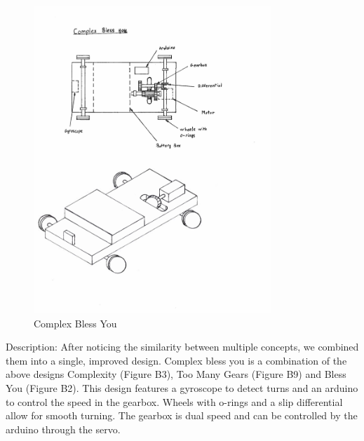 \documentclass[class=../report, crop=false]{standalone}
\begin{document}
\begin{figure}[H]
	\centering
	\includegraphics[width=0.8\textwidth]{../../res/img/cby}
	\caption{Complex Bless You}
	\label{app/fig:cby}
\end{figure}

Description: After noticing the similarity between multiple concepts, we combined them into a single, improved design.
Complex bless you is a combination of the above designs Complexity (Figure B3), Too Many Gears (Figure B9) and Bless You (Figure B2).
This design features a gyroscope to detect turns and an arduino to control the speed in the gearbox.
Wheels with o-rings and a slip differential allow for smooth turning.
The gearbox is dual speed and can be controlled by the arduino through the servo.
\end{document}

